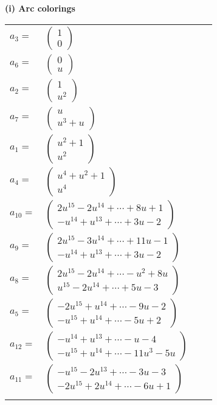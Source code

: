 \documentclass[1p]{elsarticle_modified}
\theoremstyle{definition}
\begin{document}
\flushleft \textbf{(i) Arc colorings}\\
\begin{tabular}{m{7pt} m{180pt} m{7pt} m{180pt} }
\flushright $a_{3}=$&$\begin{pmatrix}1\\0\end{pmatrix}$ \\
\flushright $a_{6}=$&$\begin{pmatrix}0\\u\end{pmatrix}$ \\
\flushright $a_{2}=$&$\begin{pmatrix}1\\u^2\end{pmatrix}$ \\
\flushright $a_{7}=$&$\begin{pmatrix}u\\u^3+u\end{pmatrix}$ \\
\flushright $a_{1}=$&$\begin{pmatrix}u^2+1\\u^2\end{pmatrix}$ \\
\flushright $a_{4}=$&$\begin{pmatrix}u^4+u^2+1\\u^4\end{pmatrix}$ \\
\flushright $a_{10}=$&$\begin{pmatrix}2 u^{15}-2 u^{14}+\cdots+8 u+1\\- u^{14}+u^{13}+\cdots+3 u-2\end{pmatrix}$ \\
\flushright $a_{9}=$&$\begin{pmatrix}2 u^{15}-3 u^{14}+\cdots+11 u-1\\- u^{14}+u^{13}+\cdots+3 u-2\end{pmatrix}$ \\
\flushright $a_{8}=$&$\begin{pmatrix}2 u^{15}-2 u^{14}+\cdots- u^2+8 u\\u^{15}-2 u^{14}+\cdots+5 u-3\end{pmatrix}$ \\
\flushright $a_{5}=$&$\begin{pmatrix}-2 u^{15}+u^{14}+\cdots-9 u-2\\- u^{15}+u^{14}+\cdots-5 u+2\end{pmatrix}$ \\
\flushright $a_{12}=$&$\begin{pmatrix}- u^{14}+u^{13}+\cdots- u-4\\- u^{15}+u^{14}+\cdots-11 u^3-5 u\end{pmatrix}$ \\
\flushright $a_{11}=$&$\begin{pmatrix}- u^{15}-2 u^{13}+\cdots-3 u-3\\-2 u^{15}+2 u^{14}+\cdots-6 u+1\end{pmatrix}$\\&\end{tabular}
\end{document}
